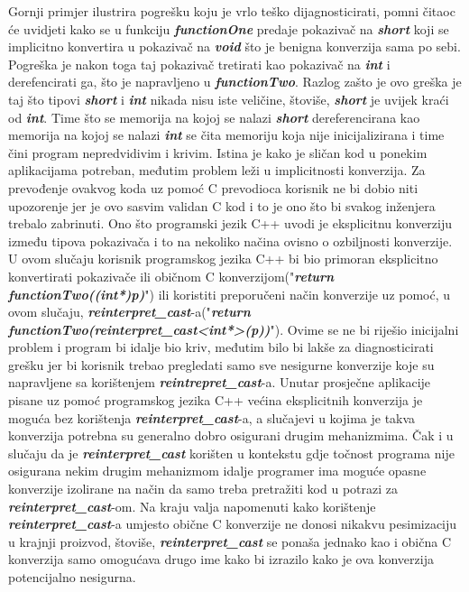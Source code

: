 Gornji primjer ilustrira pogrešku koju je vrlo teško dijagnosticirati, pomni čitaoc će uvidjeti kako se u funkciju \textbf{\textit{functionOne}} predaje pokazivač na \textbf{\textit{short}} koji se implicitno konvertira u pokazivač na \textbf{\textit{void}} što je benigna konverzija sama po sebi. Pogreška je nakon toga taj pokazivač tretirati kao pokazivač na \textbf{\textit{int}} i derefencirati ga, što je napravljeno u \textbf{\textit{functionTwo}}. Razlog zašto je ovo greška je taj što tipovi \textbf{\textit{short}} i \textbf{\textit{int}} nikada nisu iste veličine, štoviše, \textbf{\textit{short}} je uvijek kraći od \textbf{\textit{int}}. Time što se memorija na kojoj se nalazi \textbf{\textit{short}} dereferencirana kao memorija na kojoj se nalazi \textbf{\textit{int}} se čita memoriju koja nije inicijalizirana i time čini program nepredvidivim i krivim. Istina je kako je sličan kod u ponekim aplikacijama potreban, međutim problem leži u implicitnosti konverzija. Za prevođenje ovakvog koda uz pomoć C prevodioca korisnik ne bi dobio niti upozorenje jer je ovo sasvim validan C kod i to je ono što bi svakog inženjera trebalo zabrinuti. Ono što programski jezik C++ uvodi je eksplicitnu konverziju između tipova pokazivača i to na nekoliko načina ovisno o ozbiljnosti konverzije. U ovom slučaju korisnik programskog jezika C++ bi bio primoran eksplicitno konvertirati pokazivače ili običnom C konverzijom("\textbf{\textit{return functionTwo((int*)p)}}") ili koristiti preporučeni način konverzije uz pomoć, u ovom slučaju, \textbf{\textit{reinterpret\_cast}}-a("\textbf{\textit{return functionTwo(reinterpret\_cast<int*>(p))}}"). Ovime se ne bi riješio inicijalni problem i program bi idalje bio kriv, međutim bilo bi lakše za diagnosticirati grešku jer bi korisnik trebao pregledati samo sve nesigurne konverzije koje su napravljene sa korištenjem \textbf{\textit{reintrepret\_cast}}-a. Unutar prosječne aplikacije pisane uz pomoć programskog jezika C++ većina eksplicitnih konverzija je moguća bez korištenja \textbf{\textit{reinterpret\_cast}}-a, a slučajevi u kojima je takva konverzija potrebna su generalno dobro osigurani drugim mehanizmima. Čak i u slučaju da je \textbf{\textit{reinterpret\_cast}} korišten u kontekstu gdje točnost programa nije osigurana nekim drugim mehanizmom idalje programer ima moguće opasne konverzije izolirane na način da samo treba pretražiti kod u potrazi za \textbf{\textit{reinterpret\_cast}}-om. Na kraju valja napomenuti kako korištenje \textbf{\textit{reinterpret\_cast}}-a umjesto obične C konverzije ne donosi nikakvu pesimizaciju u krajnji proizvod, štoviše, \textbf{\textit{reinterpret\_cast}} se ponaša jednako kao i obična C konverzija samo omogućava drugo ime kako bi izrazilo kako je ova konverzija potencijalno nesigurna. 

